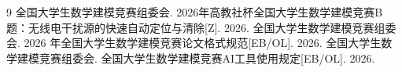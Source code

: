\begin{thebibliography}{9}
全国大学生数学建模竞赛组委会. 2026年高教社杯全国大学生数学建模竞赛B题：无线电干扰源的快速自动定位与清除[Z]. 2026.
全国大学生数学建模竞赛组委会. 2026 年全国大学生数学建模竞赛论文格式规范[EB/OL]. 2026.
全国大学生数学建模竞赛组委会. 全国大学生数学建模竞赛AI工具使用规定[EB/OL]. 2026.
\end{thebibliography}
